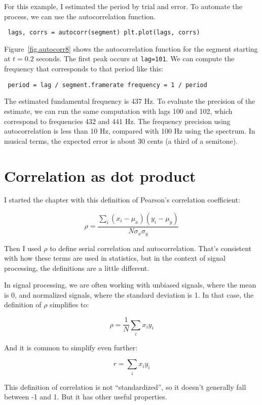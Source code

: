 \documentclass[12pt]{book} \usepackage[width=5.5in,height=8.5in, hmarginratio=3:2,vmarginratio=1:1]{geometry}
\begin{document}
For this example, I estimated the period by trial and error. To automate the process, we can use the autocorrelation function. 

\begin{verbatim} lags, corrs = autocorr(segment) plt.plot(lags, corrs) \end{verbatim} 

Figure~\ref{fig.autocorr8} shows the autocorrelation function for the segment starting at $t=0.2$ seconds. The first peak occurs at {\tt lag=101}. We can compute the frequency that corresponds to that period like this: 

\begin{verbatim} period = lag / segment.framerate frequency = 1 / period \end{verbatim} 

The estimated fundamental frequency is 437 Hz. To evaluate the precision of the estimate, we can run the same computation with lags 100 and 102, which correspond to frequencies 432 and 441 Hz. The frequency precision using autocorrelation is less than 10 Hz, compared with 100 Hz using the spectrum. In musical terms, the expected error is about 30 cents (a third of a semitone). 

\section{Correlation as dot product} \label{dotproduct} 

I started the chapter with this definition of Pearson's correlation coefficient: 

%
\[ \rho = \frac{ \sum_i (x_i - \mu_x) (y_i - \mu_y)}{N \sigma_x \sigma_y} \] 

%
Then I used $\rho$ to define serial correlation and autocorrelation. That's consistent with how these terms are used in statistics, but in the context of signal processing, the definitions are a little different. 

In signal processing, we are often working with unbiased signals, where the mean is 0, and normalized signals, where the standard deviation is 1. In that case, the definition of $\rho$ simplifies to: 

%
\[ \rho = \frac{1}{N} \sum_i x_i y_i \] 

%
And it is common to simplify even further: 

%
\[ r = \sum_i x_i y_i \] 

%
This definition of correlation is not ``standardized'', so it doesn't generally fall between -1 and 1. But it has other useful properties. 
\end{document}

